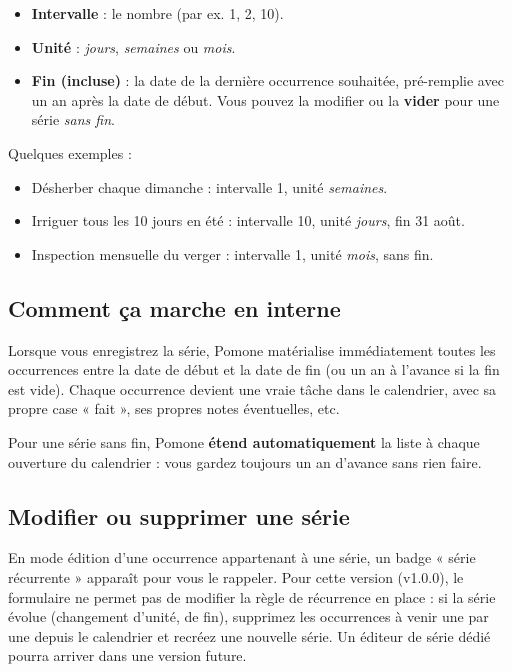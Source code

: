 \begin{itemize}
  \item \textbf{Intervalle} : le nombre (par ex. 1, 2, 10).
  \item \textbf{Unité} : \emph{jours}, \emph{semaines} ou \emph{mois}.
  \item \textbf{Fin (incluse)} : la date de la dernière occurrence souhaitée, pré-remplie avec un an après la date de début. Vous pouvez la modifier ou la \textbf{vider} pour une série \emph{sans fin}.
\end{itemize}

Quelques exemples :

\begin{itemize}
  \item Désherber chaque dimanche : intervalle 1, unité \emph{semaines}.
  \item Irriguer tous les 10 jours en été : intervalle 10, unité \emph{jours}, fin 31 août.
  \item Inspection mensuelle du verger : intervalle 1, unité \emph{mois}, sans fin.
\end{itemize}

\subsection*{Comment ça marche en interne}

Lorsque vous enregistrez la série, Pomone matérialise immédiatement toutes les occurrences entre la date de début et la date de fin (ou un an à l'avance si la fin est vide). Chaque occurrence devient une vraie tâche dans le calendrier, avec sa propre case « fait », ses propres notes éventuelles, etc.

Pour une série sans fin, Pomone \textbf{étend automatiquement} la liste à chaque ouverture du calendrier : vous gardez toujours un an d'avance sans rien faire.

\subsection*{Modifier ou supprimer une série}

En mode édition d'une occurrence appartenant à une série, un badge « série récurrente » apparaît pour vous le rappeler. Pour cette version (v1.0.0), le formulaire ne permet pas de modifier la règle de récurrence en place : si la série évolue (changement d'unité, de fin), supprimez les occurrences à venir une par une depuis le calendrier et recréez une nouvelle série. Un éditeur de série dédié pourra arriver dans une version future.

